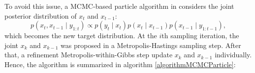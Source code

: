 To avoid this issue, a MCMC-based particle algorithm in \cite{pang2008models} considers the joint posterior distribution of $x_t$ and $x_{t-1}$:
\begin{equation}
p(x_t,x_{t-1}\mid y_{1:t})\propto p(y_t\mid x_t)p(x_t\mid x_{t-1})p(x_{t-1}\mid y_{1:t-1}),
\end{equation}
which becomes the new target distribution. At the $i$th sampling iteration, the joint $x_k$ and $x_{k-1}$ was proposed in a Metropolis-Hastings sampling step. After that, a refinement Metropolis-within-Gibbs step update $x_k$ and $x_{k-1}$ individually. Hence, the algorithm is summarized in algorithm \ref{algorithmMCMCParticle}:
